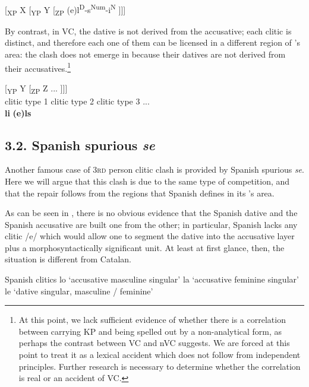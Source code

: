 \documentclass[output=paper,modfonts,nonflat,newtxmath,colorlinks,citecolor=brown]{langsci/langscibook}
\begin{document}
    \ex \label{ex:cabre:16b} {[\textsubscript{XP} X}  {[\textsubscript{YP} Y}  {[\textsubscript{ZP}  (e)l\textsuperscript{D}-s\textsuperscript{Num}-i\textsuperscript{N}} ]]]
    \z
   
    \z

By contrast, in VC, the dative is not derived from the accusative; each clitic is distinct, and therefore each one of them can be licensed in a different region of \citeauthor{Sportiche1996}’s area: the clash does not emerge in  because their datives are not derived from their accusatives.\footnote{At this point, we lack sufficient evidence of whether there is a correlation between carrying KP and being spelled out by a non-analytical form, as perhaps the contrast between VC and nVC suggests. We are forced at this point to treat it as a lexical accident which does not follow from independent principles. Further research is necessary to determine whether the correlation is real or an accident of VC.}

\ea%
    \label{ex:cabre:17}
    \gll {[\textsubscript{XP} X} { } {[\textsubscript{YP} Y} { } {[\textsubscript{ZP}  Z} ...  ]]]\\
    \footnotesize {clitic type 1} { } \footnotesize {clitic type 2} { }  \footnotesize   {clitic type 3} ...\\
    \glt \textbf{li} \textbf{(e)ls}
	\z

\subsection{3.2. Spanish spurious \textit{se}}
\label{sec:cabre:3.2}

An\-\-\-other famous case of \textsc{3rd} person clitic clash is provided by Spanish spurious \textit{se}. Here we will argue that this clash is due to the same type of competition, and that the repair follows from the regions that Spanish defines in its \citeauthor{Sportiche1996}’s area.

As can be seen in , there is no obvious evidence that the Spanish dative and the Spanish accusative are built one from the other; in particular, Spanish lacks any clitic /e/ which would allow one to segment the dative into the accusative layer plus a morphosyntactically significant unit. At least at first glance, then, the situation is different from Catalan.

\ea%
	 Spanish clitics
    \label{ex:cabre:18}
    \ea lo ‘accusative masculine singular’
    \ex la ‘accusative feminine singular’
    \ex le ‘dative singular, masculine / feminine’
    \z
    \z
\end{document}
